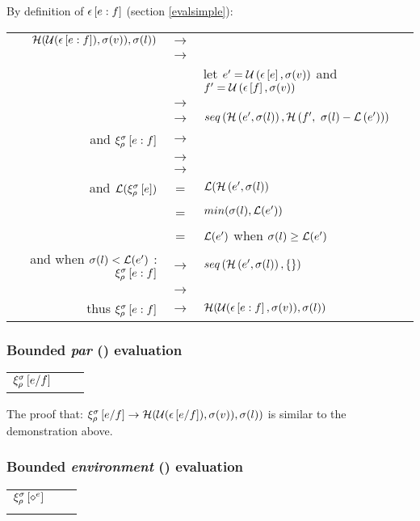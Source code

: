 \documentclass[10pt,a4paper,frenchb]{article}
\makeatletter
\newcommand{\evaltable}[1][$\rightarrow$]	  {\begin{center} \begin{tabular*}{\linewidth}{rc@{ #1 }l}}
\newcommand{\evaltablend}  		{\end{tabular*}\end{center}}
\newcommand{\evalspace}	  		{\vspace{2mm}\\}
\newcommand{\ra}					{\ensuremath{\rightarrow}}
\makeatother
\begin{document}
By definition of $\epsilon\left[e : f\right]$ (section \ref{evalsimple}):
\evaltable[]
  $\mathcal H( \mathcal U (\epsilon\left[e : f\right]), \sigma(v)), \sigma(l))$						
  		& \ra & \equivalence{\sevalSeq{e}{f}} \\
		& \ra & \headOp{\topSeq{\evalss{e}}{\evalss{f}}{\bounds(v)}}{\bounds(l)} \\
	 	&     & let $e'= \mathcal U\left(\epsilon\left[e\right], \sigma(v)\right)$ and $f'=\mathcal U\left(\epsilon\left[f\right], \sigma(v)\right)$ \\
		& \ra & \headOp{\seqOp{e'}{f'}}{\bounds(l)} \\
		& \ra & $seq\left(\mathcal H\left(e', \sigma(l)\right), \mathcal H\left(f', \ \sigma(l) - \mathcal L\left(e'\right)\right)\right)$
\evalspace
  and $\xi_{\rho}^{\sigma}\left[e : f\right]$
  		& \ra & \bevalSeq{e}{f}  \\
  		& \ra & \seqOp{\equivalence{\evalss{e}}}{\equivl{\evalss{f}}{l:=l-\length(\evalexpr{e})}} \\
  		& \ra & \seqOp{\headOp{e'}{\bounds(l)}}{\headOp{f'}{\bounds(l:=l-\length(\evalexpr{e})}}
\evalspace
and   $\mathcal L(\xi_{\rho}^{\sigma}\left[e\right])$
	& = & $\mathcal L(\mathcal H\left(e', \sigma(l)\right)$ \\
	& = & $min(\sigma(l), \mathcal L(e'))$ \\
	& = & $\mathcal L(e')$ when  $\sigma(l) \geq \mathcal L(e')$ 
\evalspace
and when $\sigma(l) < \mathcal L(e')$ : \:\:  $\xi_{\rho}^{\sigma}\left[e : f\right]$ & \ra & $seq\left(\mathcal H\left(e', \sigma(l)\right), \{\}\right)$ \\
\headSeq{e'}{f'}{\bounds(l)} & \ra & \seqOp{\headOp{e'}{\bounds(l)}}{\emptyScore}
\evalspace
thus $\xi_{\rho}^{\sigma}\left[e : f\right]$ & \ra & $\mathcal H( \mathcal U (\epsilon\left[e : f\right], \sigma(v)), \sigma(l))$
								
\evaltablend


\subsubsection{Bounded \emph{par} (\mix) evaluation}

\evaltable
 $\xi_{\rho}^{\sigma}\left[e / f\right]$	 &  &  \bevalMix{e}{f}
\evaltablend

The proof that: \:\: $\xi_{\rho}^{\sigma}\left[e / f\right] \rightarrow \mathcal H( \mathcal U (\epsilon\left[e / f\right]), \sigma(v)), \sigma(l))$ is similar to the demonstration above. \\


\subsubsection{Bounded \emph{environment} (\envsym) evaluation}
\evaltable
 $\xi_{\rho}^{\sigma}\left[\diamond^e\right]$ 	&  & \headOp{\top(\ \envsym(\var{e}), \bounds(v))}{\bounds(l))} \\
					  		&  & \headOp{\top(\ \evalss{\var{e}}, \bounds(v))}{\bounds(l))}
\evaltablend
\end{document}
